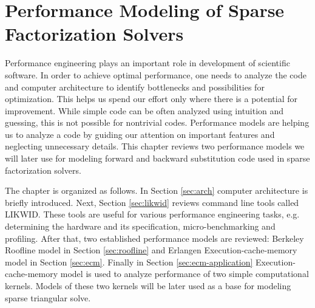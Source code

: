 \chapter{Performance Modeling of Sparse Factorization Solvers}


Performance engineering plays an important role in development of scientific software. In order to achieve optimal performance, one needs to analyze the code and computer architecture to identify bottlenecks and possibilities for optimization. This helps us spend our effort only where there is a potential for improvement.
While simple code can be often analyzed using intuition and guessing, this is not possible for nontrivial codes. Performance models are helping us to analyze a code by guiding our attention on important features and neglecting unnecessary details.
%
%
%
This chapter reviews two performance models we will later use for modeling forward and backward substitution code used in sparse factorization solvers.

The chapter is organized as follows. In Section \ref{sec:arch} computer architecture is briefly introduced. Next, Section \ref{sec:likwid} reviews command line tools called LIKWID. These tools are useful for various performance engineering tasks, e.g. determining the hardware and its specification, micro-benchmarking and profiling. After that, two established performance models are reviewed: Berkeley Roofline model in Section \ref{sec:roofline} and Erlangen Execution-cache-memory model in Section \ref{sec:ecm}. Finally in Section \ref{sec:ecm-application} Execution-cache-memory model is used to analyze performance of two simple computational kernels. Models of these two kernels will be later used as a base for modeling sparse triangular solve.

